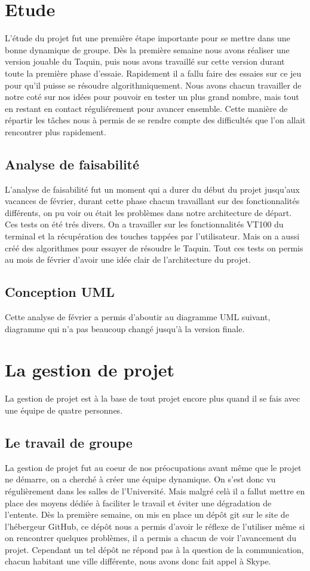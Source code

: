 ﻿\documentclass[a4paper,twoside,12pt]{report}
\begin{document}
%
\chapter{Etude}
L'étude du projet fut une première étape importante pour se mettre dans une bonne dynamique de groupe. Dès la première semaine
nous avons réaliser une version jouable du Taquin, puis nous avons travaillé sur cette version durant toute la première phase d'essaie.
Rapidement il a fallu faire des essaies sur ce jeu pour qu'il puisse se résoudre algorithmiquement. Nous avons chacun travailler de notre
coté sur nos idées pour pouvoir en tester un plus grand nombre, mais tout en restant en contact réguliérement pour avancer ensemble.
Cette manière de répartir les tâches nous à permis de se rendre compte des difficultés que l'on allait rencontrer plus rapidement.
%
\section{Analyse de faisabilité}
L'analyse de faisabilité fut un moment qui a durer du début du projet jusqu'aux vacances de février, durant cette phase chacun travaillant
sur des fonctionnalités différents, on pu voir ou était les problèmes dans notre architecture de départ. Ces tests on été trés divers. On
a travailler sur les fonctionnalités VT100 du terminal et la récupération des touches tappées par l'utilisateur. Mais on a aussi créé des
algorithmes pour essayer de résoudre le Taquin. Tout ces tests on permis au mois de février d'avoir une idée clair de l'architecture du
projet.
\section{Conception UML}
Cette analyse de février a permis d'aboutir au diagramme UML suivant, diagramme qui n'a pas beaucoup changé jusqu'à la version finale.
\chapter{La gestion de projet}
%
La gestion de projet est à la base de tout projet encore plus quand il se fais avec une équipe de quatre personnes.
\section{Le travail de groupe}
%
La gestion de projet fut au coeur de nos préocupations avant même que le projet ne démarre, on a cherché à créer une équipe dynamique. On
s'est donc vu régulièrement dans les salles de l'Université. Mais
malgré celà il a fallut mettre en place des moyens dédiée à faciliter le travail et éviter une dégradation de l'entente. Dès la
première semaine, on mis en place un dépôt git sur le site de l'hébergeur GitHub, ce dépôt nous a permis d'avoir le réflexe de l'utiliser même 
si on rencontrer quelques problèmes, il a permis a chacun de voir l'avancement du projet.
Cependant un tel dépôt ne répond pas à la question de la communication, chacun habitant une ville différente, nous avons donc fait
appel à Skype.
\end{document}
